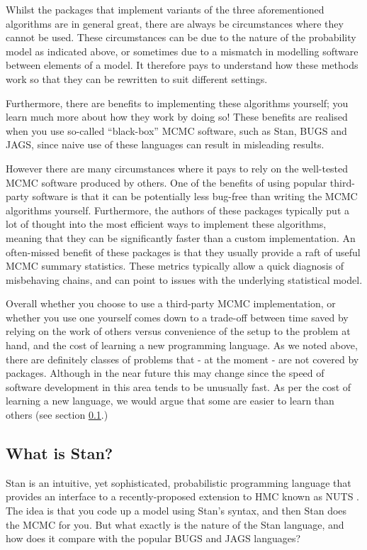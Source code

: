 \documentclass[11pt,fullpage]{book}
\begin{document}
Whilst the packages that implement variants of the three aforementioned algorithms are in general great, there are always be circumstances where they cannot be used. These circumstances can be due to the nature of the probability model as indicated above, or sometimes due to a mismatch in modelling software between elements of a model. It therefore pays to understand how these methods work so that they can be rewritten to suit different settings.

Furthermore, there are benefits to implementing these algorithms yourself; you learn much more about how they work by doing so! These benefits are realised when you use so-called ``black-box'' MCMC software, such as Stan, BUGS and JAGS, since naive use of these languages can result in misleading results. 

However there are many circumstances where it pays to rely on the well-tested MCMC software produced by others. One of the benefits of using popular third-party software is that it can be potentially less bug-free than writing the MCMC algorithms yourself. Furthermore, the authors of these packages typically put a lot of thought into the most efficient ways to implement these algorithms, meaning that they can be significantly faster than a custom implementation. An often-missed benefit of these packages is that they usually provide a raft of useful MCMC summary statistics. These metrics typically allow a quick diagnosis of misbehaving chains, and can point to issues with the underlying statistical model.

Overall whether you choose to use a third-party MCMC implementation, or whether you use one yourself comes down to a trade-off between time saved by relying on the work of others versus convenience of the setup to the problem at hand, and the cost of learning a new programming language. As we noted above, there are definitely classes of problems that - at the moment - are not covered by packages. Although in the near future this may change since the speed of software development in this area tends to be unusually fast. As per the cost of learning a new language, we would argue that some are easier to learn than others (see section \ref{sec:StanJags_whatIsStan}.)

\subsection{What is Stan?}\label{sec:StanJags_whatIsStan}
Stan is an intuitive, yet sophisticated, probabilistic programming language that provides an interface to a recently-proposed extension to HMC known as NUTS \citep{hoffman2014no,carpenter2016stan}. The idea is that you code up a model using Stan's syntax, and then Stan does the MCMC for you. But what exactly is the nature of the Stan language, and how does it compare with the popular BUGS and JAGS languages?
\end{document}
